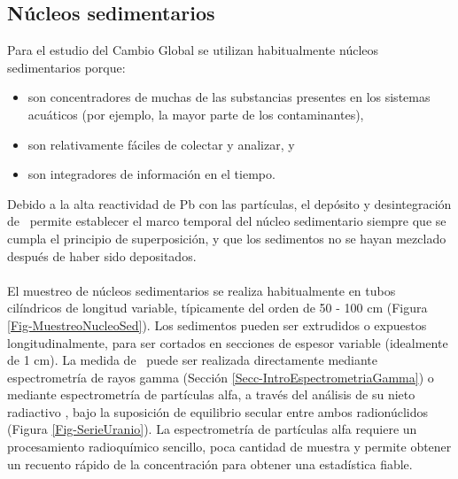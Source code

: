 	\subsection{Núcleos sedimentarios}\label{SubSec-Sedimentos}
Para el estudio del Cambio Global se utilizan habitualmente núcleos sedimentarios porque:
\begin{itemize}
\item son concentradores de muchas de las substancias presentes en los sistemas acuáticos (por ejemplo, la mayor parte de los contaminantes),
\item son relativamente fáciles de colectar y analizar, y
\item son integradores de información en el tiempo.
\end{itemize}
Debido a la alta reactividad de Pb con las partículas, el depósito y desintegración de \PbCero\, permite establecer el marco temporal del núcleo sedimentario siempre que se cumpla el principio de superposición, y que los sedimentos no se hayan mezclado después de haber sido depositados.
\\
\\
El muestreo de núcleos sedimentarios se realiza habitualmente en tubos cilíndricos de longitud variable, típicamente del orden de 50 - 100 cm (Figura \ref{Fig-MuestreoNucleoSed}). Los sedimentos pueden ser extrudidos o expuestos longitudinalmente, para ser cortados en secciones de espesor variable (idealmente de 1 cm). La medida de \PbCero\, puede ser realizada directamente mediante espectrometría de rayos gamma (Sección \ref{Secc-IntroEspectrometriaGamma}) o mediante espectrometría de partículas alfa, a través del análisis de su nieto radiactivo \Po, bajo la suposición de equilibrio secular entre ambos radionúclidos (Figura \ref{Fig-SerieUranio}). La espectrometría de partículas alfa requiere un procesamiento radioquímico sencillo, poca cantidad de muestra y permite obtener un recuento rápido de la concentración para obtener una estadística fiable.

